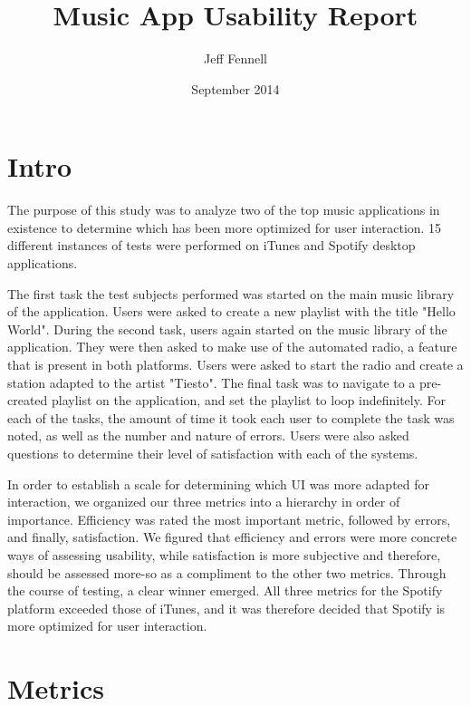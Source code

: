 \documentclass[12pt]{article}
\begin{document}
\title{Music App Usability Report}
\author{Jeff Fennell}
\date{September 2014}
\maketitle

\tableofcontents

\section{Intro}

The purpose of this study was to analyze two of the top music 
applications in existence to determine which has been more 
optimized for user interaction. 15 different instances of tests 
were performed on iTunes and Spotify desktop applications.

The first task the test subjects performed was started on the main 
music library of the application. Users were asked to create a new 
playlist with the title "Hello World".  During the second task, 
users again started on the music library of the application. They 
were then asked to make use of the automated radio, a feature that 
is present in both platforms. Users were asked to start the radio 
and create a station adapted to the artist "Tiesto". The final 
task was to navigate to a pre-created playlist on the application, 
and set the playlist to loop indefinitely. For each of the tasks, 
the amount of time it took each user to complete the task was 
noted, as well as the number and nature of errors. Users were also 
asked questions to determine their level of satisfaction with each 
of the systems.

In order to establish a scale for determining which UI was more 
adapted for interaction, we organized our three metrics into a 
hierarchy in order of importance. Efficiency was rated the most 
important metric, followed by errors, and finally, satisfaction. 
We figured that efficiency and errors were more concrete ways of 
assessing usability, while satisfaction is more subjective and 
therefore, should be assessed more-so as a compliment to the other 
two metrics. Through the course of testing, a clear winner 
emerged. All three metrics for the Spotify platform exceeded those 
of iTunes, and it was therefore decided that Spotify is more 
optimized for user interaction.

\section{Metrics}
\end{document}
